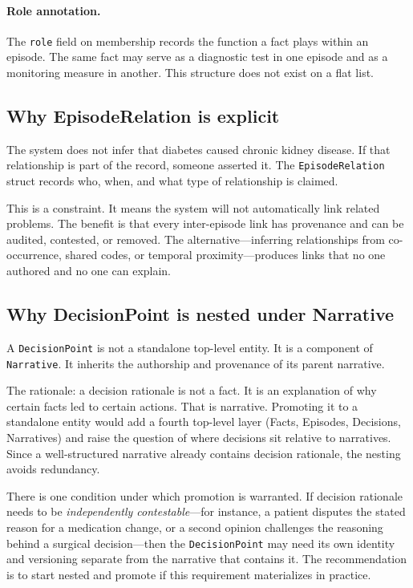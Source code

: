 \documentclass[11pt]{article}
\begin{document}
\paragraph{Role annotation.}
The \texttt{role} field on membership records the function a fact plays
within an episode. The same fact may serve as a diagnostic test in one
episode and as a monitoring measure in another. This structure does not exist
on a flat list.


\subsection{Why EpisodeRelation is explicit}
\label{sec:relation-rationale}

The system does not infer that diabetes caused chronic kidney disease. If
that relationship is part of the record, someone asserted it. The
\texttt{EpisodeRelation} struct records who, when, and what type of
relationship is claimed.

This is a constraint. It means the system will not automatically link
related problems. The benefit is that every inter-episode link has provenance
and can be audited, contested, or removed. The alternative---inferring
relationships from co-occurrence, shared codes, or temporal
proximity---produces links that no one authored and no one can explain.

\subsection{Why DecisionPoint is nested under Narrative}
\label{sec:decision-point-rationale}

A \texttt{DecisionPoint} is not a standalone top-level entity. It is a
component of \texttt{Narrative}. It inherits the authorship and provenance
of its parent narrative.

The rationale: a decision rationale is not a fact. It is an explanation of
why certain facts led to certain actions. That is narrative. Promoting it to
a standalone entity would add a fourth top-level layer (Facts, Episodes,
Decisions, Narratives) and raise the question of where decisions sit relative
to narratives. Since a well-structured narrative already contains decision
rationale, the nesting avoids redundancy.

There is one condition under which promotion is warranted. If decision
rationale needs to be \emph{independently contestable}---for instance, a
patient disputes the stated reason for a medication change, or a second
opinion challenges the reasoning behind a surgical decision---then the
\texttt{DecisionPoint} may need its own identity and versioning separate
from the narrative that contains it. The recommendation is to start nested
and promote if this requirement materializes in practice.
\end{document}

